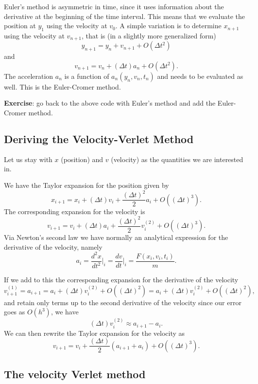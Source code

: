 \documentclass[%
oneside,                 %
final,                   %
10pt]{article}
\begin{document}
Euler's method is asymmetric in time, since it uses information about the derivative at the beginning
of the time interval. This means that we evaluate the position at $y_1$ using the velocity
at $v_0$. A simple variation is to determine $x_{n+1}$ using the velocity at
$v_{n+1}$, that is (in a slightly more generalized form)
\begin{equation} 
y_{n+1}=y_{n}+ v_{n+1}+O(\Delta t^2)
\end{equation}
and 
\begin{equation}
v_{n+1}=v_{n}+(\Delta t) a_{n}+O(\Delta t^2).
\end{equation}
The acceleration $a_n$ is a function of $a_n(y_n, v_n, t_n)$ and needs to be evaluated
as well. This is the Euler-Cromer method.

\textbf{Exercise}: go back to the above code with Euler's method and add the Euler-Cromer method. 

\subsection*{Deriving the Velocity-Verlet Method}

Let us stay with $x$ (position) and $v$ (velocity) as the quantities we are interested in.

We have the Taylor expansion for the position given by
\[
x_{i+1} = x_i+(\Delta t)v_i+\frac{(\Delta t)^2}{2}a_i+O((\Delta t)^3).
\]
The corresponding expansion for the velocity is 
\[
v_{i+1} = v_i+(\Delta t)a_i+\frac{(\Delta t)^2}{2}v^{(2)}_i+O((\Delta t)^3).
\]
Via Newton's second law we have normally an analytical expression for the derivative of the velocity, namely
\[
a_i= \frac{d^2 x}{dt^2}\vert_{i}=\frac{d v}{dt}\vert_{i}= \frac{F(x_i,v_i,t_i)}{m}.
\]

If we add to this the corresponding expansion for the derivative of the velocity 
\[
v^{(1)}_{i+1} = a_{i+1}= a_i+(\Delta t)v^{(2)}_i+O((\Delta t)^2)=a_i+(\Delta t)v^{(2)}_i+O((\Delta t)^2), 
\]
and retain only terms up to the second derivative of the velocity since our error goes as $O(h^3)$, we have
\[
(\Delta t)v^{(2)}_i\approx a_{i+1}-a_i.
\]
We can then rewrite the Taylor expansion for the velocity as  
\[
v_{i+1} = v_i+\frac{(\Delta t)}{2}\left( a_{i+1}+a_{i}\right)+O((\Delta t)^3).
\]

\subsection*{The velocity Verlet method}
\end{document}
